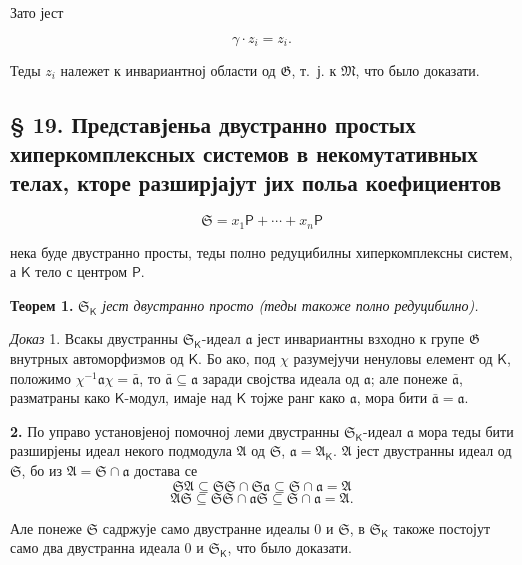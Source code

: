\documentclass[11pt]{article}
\begin{document}
Зато јест

\[
\gamma\cdot z_i=z_i.
\]

Теды \(z_i\) належет к инвариантној области од \(\mathfrak G\), т.~ј. к \(\mathfrak M\), что было доказати.

\subsection*{§ 19. Представјеньа двустранно простых хиперкомплексных системов в некомутативных телах, кторе разширјајут јих польа коефициентов}\label{darstellungen-zweiseitig-einfacher-hyperkomplexer-systeme-in-nichtkommutativen-erweiterungskoerpern-ihrer-koeffizientenkoerper}

\[
\mathfrak S=x_1\mathsf P+\cdots+x_n\mathsf P
\]

нека буде двустранно просты, теды полно редуцибилны хиперкомплексны систем, а \(\mathsf K\) тело с центром \(\mathsf P\).

\textbf{Теорем 1.} \emph{\(\mathfrak S_{\mathsf K}\) јест двустранно просто (теды такоже полно редуцибилно).}

\emph{Доказ} 1. Всакы двустранны \(\mathfrak S_{\mathsf K}\)-идеал \(\mathfrak a\) јест инвариантны взходно к групе \(\mathfrak G\) внутрных автоморфизмов од \(\mathsf K\). Бо ако, под \(\chi\) разумејучи ненуловы елемент од \(\mathsf K\), положимо \(\chi^{-1}\mathfrak a\chi=\bar{\mathfrak a}\), то \(\bar{\mathfrak a}\subseteq\mathfrak a\) заради својства идеала од \(\mathfrak a\); але понеже \(\bar{\mathfrak a}\), разматраны како \(\mathsf K\)-модул, имаје над \(\mathsf K\) тојже ранг како \(\mathfrak a\), мора бити \(\bar{\mathfrak a}=\mathfrak a\).

\textbf{2.} По управо установјеној помочној леми двустранны \(\mathfrak S_{\mathsf K}\)-идеал \(\mathfrak a\) мора теды бити разширјены идеал некого подмодула \(\mathfrak A\) од \(\mathfrak S\), \(\mathfrak a=\mathfrak A_{\mathsf K}\). \(\mathfrak A\) јест двустранны идеал од \(\mathfrak S\), бо из \(\mathfrak A=\mathfrak S\cap\mathfrak a\) достава се
\[
\mathfrak S\mathfrak A\subseteq\mathfrak S\mathfrak S\cap\mathfrak S\mathfrak a\subseteq\mathfrak S\cap\mathfrak a=\mathfrak A
\]
\[
\mathfrak A\mathfrak S\subseteq\mathfrak S\mathfrak S\cap\mathfrak a\mathfrak S\subseteq\mathfrak S\cap\mathfrak a=\mathfrak A.
\]

Але понеже \(\mathfrak S\) садржује само двустранне идеалы 0 и \(\mathfrak S\), в \(\mathfrak S_{\mathsf K}\) такоже постојут само два двустранна идеала 0 и \(\mathfrak S_{\mathsf K}\), что было доказати.
\end{document}
